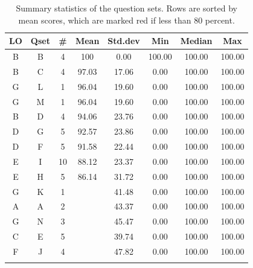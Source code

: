 \documentclass[12pt,english,nohyper]{tufte-handout}\usepackage[]{graphicx}\usepackage[]{color}
\begin{document}
\begin{fullwidth}
\makeatletter\setlength\hsize{\@tufte@fullwidth}\makeatother
\begin{longtable}{cc|ccc|ccc}
  \hline
LO & Qset & \# & Mean & Std.dev & Min & Median & Max \\ 
  \hline
B & B &   4 & 100 & 0.00 & 100.00 & 100.00 & 100.00 \\ 
  B & C &   4 & 97.03 & 17.06 & 0.00 & 100.00 & 100.00 \\ 
  G & L &   1 & 96.04 & 19.60 & 0.00 & 100.00 & 100.00 \\ 
  G & M &   1 & 96.04 & 19.60 & 0.00 & 100.00 & 100.00 \\ 
  B & D &   4 & 94.06 & 23.76 & 0.00 & 100.00 & 100.00 \\ 
  D & G &   5 & 92.57 & 23.86 & 0.00 & 100.00 & 100.00 \\ 
  D & F &   5 & 91.58 & 22.44 & 0.00 & 100.00 & 100.00 \\ 
  E & I &  10 & 88.12 & 23.37 & 0.00 & 100.00 & 100.00 \\ 
  E & H &   5 & 86.14 & 31.72 & 0.00 & 100.00 & 100.00 \\ 
  G & K &   1 & \color{red}{78.22} & 41.48 & 0.00 & 100.00 & 100.00 \\ 
  A & A &   2 & \color{red}{75.25} & 43.37 & 0.00 & 100.00 & 100.00 \\ 
  G & N &   3 & \color{red}{71.29} & 45.47 & 0.00 & 100.00 & 100.00 \\ 
  C & E &   5 & \color{red}{67.82} & 39.74 & 0.00 & 100.00 & 100.00 \\ 
  F & J &   4 & \color{red}{65.35} & 47.82 & 0.00 & 100.00 & 100.00 \\ 
   \hline
\hline
\caption{Summary statistics of the question sets. Rows are sorted by mean scores, which are marked red if less than 80 percent.} 
\label{tab:QuestionSet_summary}
\end{longtable}

\end{fullwidth}
\end{document}
